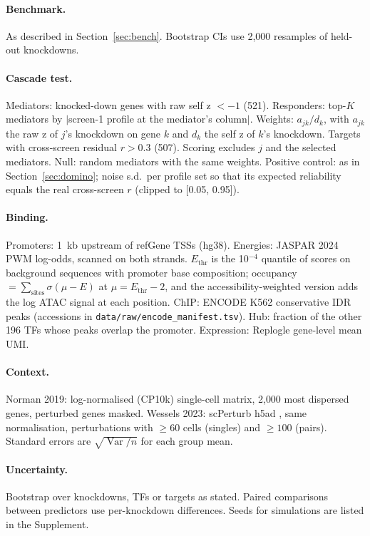\documentclass[10pt]{article}
\begin{document}
\paragraph{Benchmark.} As described in Section~\ref{sec:bench}. Bootstrap CIs use 2{,}000 resamples of held-out knockdowns.
\paragraph{Cascade test.} Mediators: knocked-down genes with raw self z $<-1$ (521). Responders: top-$K$ mediators by $|$screen-1 profile at the mediator's column$|$. Weights: $a_{jk}/d_k$, with $a_{jk}$ the raw z of $j$'s knockdown on gene $k$ and $d_k$ the self z of $k$'s knockdown.
Targets with cross-screen residual $r>0.3$ (507). Scoring excludes $j$ and the selected mediators. Null: random mediators with the same weights. Positive control: as in Section~\ref{sec:domino}; noise s.d.\ per profile set so that its expected reliability equals the real cross-screen $r$ (clipped to [0.05, 0.95]).
\paragraph{Binding.} Promoters: 1~kb upstream of refGene TSSs (hg38). Energies: JASPAR 2024 \citep{jaspar2024} PWM log-odds, scanned on both strands. $E_\text{thr}$ is the 10$^{-4}$ quantile of scores on background sequences with promoter base composition; occupancy $=\sum_\text{sites}\sigma(\mu-E)$ at $\mu=E_\text{thr}-2$, and the accessibility-weighted version adds the log ATAC signal at each position.
ChIP: ENCODE K562 conservative IDR peaks \citep{encode2020} (accessions in \texttt{data/raw/encode\_manifest.tsv}). Hub: fraction of the other 196 TFs whose peaks overlap the promoter. Expression: Replogle gene-level mean UMI.
\paragraph{Context.} Norman 2019: log-normalised (CP10k) single-cell matrix, 2{,}000 most dispersed genes, perturbed genes masked. Wessels 2023: scPerturb h5ad \citep{peidli2024scperturb}, same normalisation, perturbations with $\ge60$ cells (singles) and $\ge100$ (pairs). Standard errors are $\sqrt{\operatorname{Var}/n}$ for each group mean.
\paragraph{Uncertainty.} Bootstrap over knockdowns, TFs or targets as stated. Paired comparisons between predictors use per-knockdown differences. Seeds for simulations are listed in the Supplement.
\end{document}
